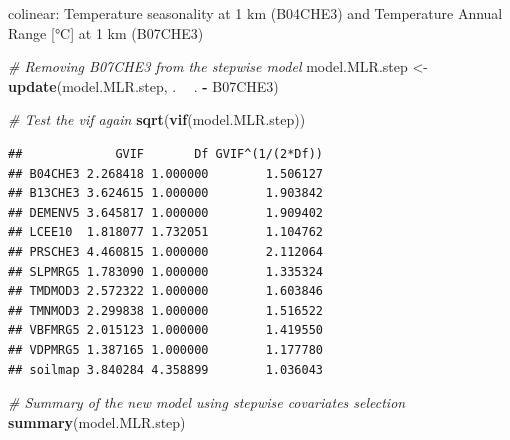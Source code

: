 \documentclass[10pt,b5paper,]{book}
\newenvironment{Shaded}{\begin{snugshade}}{\end{snugshade}}
\newcommand{\CommentTok}[1]{\textcolor[rgb]{0.56,0.35,0.01}{\textit{#1}}}
\newcommand{\KeywordTok}[1]{\textcolor[rgb]{0.13,0.29,0.53}{\textbf{#1}}}
\newcommand{\NormalTok}[1]{#1}
\newcommand{\OperatorTok}[1]{\textcolor[rgb]{0.81,0.36,0.00}{\textbf{#1}}}
\newcommand{\StringTok}[1]{\textcolor[rgb]{0.31,0.60,0.02}{#1}}
\theoremstyle{definition}
\theoremstyle{definition}
\theoremstyle{definition}
\theoremstyle{remark}
\begin{document}
colinear: Temperature seasonality at 1 km (B04CHE3) and Temperature
Annual Range {[}°C{]} at 1 km (B07CHE3)

\begin{Shaded}
\begin{Highlighting}[]
\CommentTok{# Removing B07CHE3 from the stepwise model}
\NormalTok{model.MLR.step <-}\StringTok{ }\KeywordTok{update}\NormalTok{(model.MLR.step, . }\OperatorTok{~}\StringTok{ }\NormalTok{. }\OperatorTok{-}\StringTok{ }\NormalTok{B07CHE3)}

\CommentTok{# Test the vif again}
\KeywordTok{sqrt}\NormalTok{(}\KeywordTok{vif}\NormalTok{(model.MLR.step))}
\end{Highlighting}
\end{Shaded}

\begin{verbatim}
##             GVIF       Df GVIF^(1/(2*Df))
## B04CHE3 2.268418 1.000000        1.506127
## B13CHE3 3.624615 1.000000        1.903842
## DEMENV5 3.645817 1.000000        1.909402
## LCEE10  1.818077 1.732051        1.104762
## PRSCHE3 4.460815 1.000000        2.112064
## SLPMRG5 1.783090 1.000000        1.335324
## TMDMOD3 2.572322 1.000000        1.603846
## TMNMOD3 2.299838 1.000000        1.516522
## VBFMRG5 2.015123 1.000000        1.419550
## VDPMRG5 1.387165 1.000000        1.177780
## soilmap 3.840284 4.358899        1.036043
\end{verbatim}

\begin{Shaded}
\begin{Highlighting}[]
\CommentTok{# Summary of the new model using stepwise covariates selection}
\KeywordTok{summary}\NormalTok{(model.MLR.step)}
\end{Highlighting}
\end{Shaded}
\end{document}

